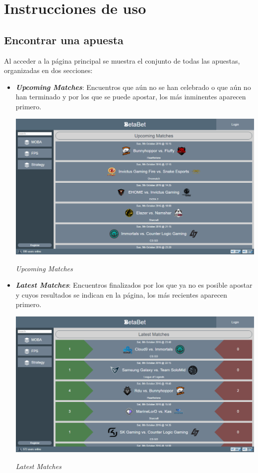 \documentclass{article}
\begin{document}
\section{Instrucciones de uso}
\subsection{Encontrar una apuesta}
Al acceder a la página principal se muestra el conjunto de todas las apuestas, organizadas en dos secciones:
\begin{itemize}
    \item\textbf{\textit{Upcoming Matches}}: Encuentros que aún no se han celebrado o que aún no han terminado y por los que se puede apostar, los más inminentes aparecen primero.
    \smallskip\newline
    \begin{minipage}{\linewidth}
        \centering
        \captionsetup{type=figure}
        \includegraphics[width=.9\linewidth]{fig1}
        \caption{\textit{Upcoming Matches}}
        \label{fig:fig1}
    \end{minipage}
    \item\textbf{\textit{Latest Matches}}: Encuentros finalizados por los que ya no es posible apostar y cuyos resultados se indican en la página, los más recientes aparecen primero.\
    \smallskip\newline
    \begin{minipage}{\linewidth}
        \centering
        \captionsetup{type=figure}
        \includegraphics[width=.9\linewidth]{fig2}
        \caption{\textit{Latest Matches}}
        \label{fig:fig2}
    \end{minipage}
\end{itemize}
\end{document}

